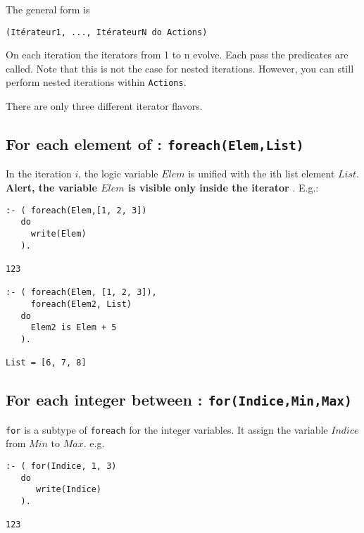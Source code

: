 The general form is 
\begin{verbatim}
(Itérateur1, ..., ItérateurN do Actions)
\end{verbatim}
On each iteration the iterators from 1 to n evolve. Each pass the predicates are called. Note that this is not the case for nested iterations. However, you can still perform nested iterations within \verb|Actions|.

There are only three different iterator flavors. 

\subsection{For each element of  : {\tt foreach(Elem,List)}}
  In the iteration $i$, the logic variable $ Elem$ is unified with the ith
  list element $List$. \textbf{Alert, the variable $Elem$ is visible only inside the iterator
  }. E.g.: 
\begin{verbatim}
:- ( foreach(Elem,[1, 2, 3]) 
   do 
     write(Elem)
   ).

123

:- ( foreach(Elem, [1, 2, 3]), 
     foreach(Elem2, List) 
   do 
     Elem2 is Elem + 5
   ). 

List = [6, 7, 8]
\end{verbatim}

 
\subsection{For each integer between : {\tt for(Indice,Min,Max)}}
  \verb!for! is a subtype of \verb!foreach! for the integer variables. It assign the variable $Indice$ from $Min$ to $Max$. e.g.
\begin{verbatim}
:- ( for(Indice, 1, 3) 
   do 
      write(Indice)
   ).

123
\end{verbatim}

 
